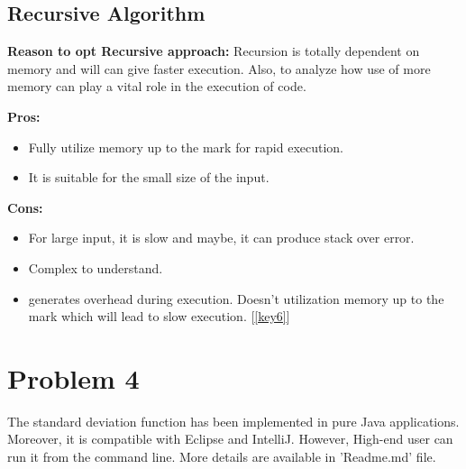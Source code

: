 \documentclass{scrartcl}
\begin{document}
\subsection{Recursive Algorithm}

\begin{spacing}{1.5}
\begin{Large}
\textbf{Reason to opt Recursive approach:} 
Recursion is totally dependent on memory and will can give faster execution. Also, to analyze how use of more memory can play a vital role in the execution of code.
\end{Large}
\end{spacing}

\begin{Large}
\vspace{0.5cm}
\textbf{Pros:}
\begin{itemize}
  \item Fully utilize memory up to the mark for rapid execution.
  \item It is suitable for the small size of the input.
\end{itemize}
\end{Large}

\begin{Large}
\vspace{0.5cm}
\textbf{Cons:}
\begin{itemize}
  \item For large input, it is slow and maybe, it can produce stack over error.
  \item Complex to understand. 
  \item generates overhead during execution. 
  Doesn't utilization memory up to the mark which will lead to slow execution. [\ref{key6}]
\end{itemize}
\end{Large}

\newpage

\section{Problem 4}

\begin{spacing}{1.5}
\begin{Large}
The standard deviation function has been implemented in pure Java applications. Moreover, it is compatible with Eclipse and IntelliJ. However, High-end user can run it from the command line. More details are available in ’Readme.md’ file.
\end{Large}
\end{spacing}
\end{document}
